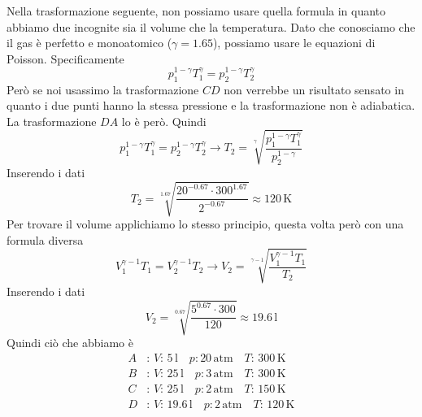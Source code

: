 Nella trasformazione seguente, non possiamo usare quella formula in quanto abbiamo due incognite
sia il volume che la temperatura. Dato che conosciamo che il gas è perfetto e monoatomico ($\gamma =
1.65$), possiamo usare le equazioni di Poisson. Specificamente
\begin{equation*}
p_1^{1-\gamma}T_1^\gamma = p_2^{1-\gamma}T_2^\gamma
\end{equation*}
Però se noi usassimo la trasformazione $CD$ non verrebbe un risultato sensato in quanto i due punti
hanno la stessa pressione e la trasformazione non è adiabatica. La trasformazione $DA$ lo è però.
Quindi
\begin{equation*}
p_1^{1-\gamma}T_1^\gamma = p_2^{1-\gamma}T_2^\gamma\rightarrow T_2 = 
\sqrt[\gamma]{\frac{p_1^{1-\gamma}T_1^\gamma}{p_2^{1-\gamma}}}
\end{equation*}
Inserendo i dati
\begin{equation*}
T_2 = \sqrt[1.67]{\frac{20^{-0.67}\cdot300^1.67}{2^{-0.67}}} \approx \boxed{120\,\text{K}}
\end{equation*}
Per trovare il volume applichiamo lo stesso principio, questa volta però con una formula diversa
\begin{equation*}
V_1^{\gamma-1}T_1 = V_2^{\gamma-1}T_2\rightarrow V_2=\sqrt[\gamma-1]{\frac{V_1^{\gamma-1}T_1}{T_2}}
\end{equation*}
Inserendo i dati
\begin{equation*}
V_2 = \sqrt[0.67]{\frac{5^{0.67}\cdot300}{120}} \approx\boxed{19.6\,\text{l}}
\end{equation*}
Quindi ciò che abbiamo è
\begin{align*}
A&:\, V:\,5\,\text{l}\quad p:20\,\text{atm}\quad T:\,300\,\text{K}\\
B&:\, V:\,25\,\text{l}\quad p:3\,\text{atm}\quad T:\,300\,\text{K}\\
C&:\, V:\,25\,\text{l}\quad p:2\,\text{atm}\quad T:\,150\,\text{K}\\
D&:\, V:\,19.6\,\text{l}\quad p:2\,\text{atm}\quad T:\,120\,\text{K}
\end{align*}

